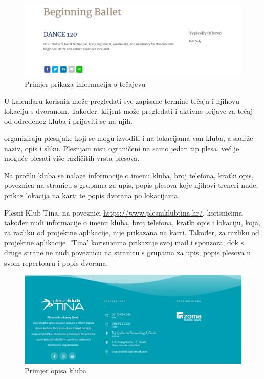 \begin{figure}[H]
	\centering
	\includegraphics[scale=0.3]{slike/opis_2.png}
	\caption{Primjer prikaza informacija o tečajevu}
	\label{fig:screenshot002}
\end{figure}

\noindent U kalendaru korisnik može pregledati sve zapisane termine tečaja i njihovu lokaciju s dvoranom. Također, klijent može pregledati i aktivne prijave za tečaj od određenog kluba i prijaviti se na njih.

\noindent {} organiziraju plesnjake koji se mogu izvoditi i na lokacijama van kluba, a sadrže naziv, opis i sliku. Plesnjaci nisu ograničeni na samo jedan tip plesa, već je moguće plesati više različitih vrsta plesova.

\noindent Na profilu kluba se nalaze informacije o imenu kluba, broj telefona, kratki opis, poveznica na stranicu s grupama za upis, popis plesova koje njihovi treneri nude, prikaz lokacija na karti te popis dvorana po lokacijama.

\noindent Plesni Klub Tina, na poveznici \url{https://www.plesniklubtina.hr/}, korisnicima također nudi informacije o imenu kluba, broj telefona, kratki opis i lokaciju, koja, za razliku od projektne aplikacije, nije prikazana na karti. Također, za razliku od projektne aplikacije, 'Tina' korisnicima prikazuje svoj mail i sponzora, dok s druge strane ne nudi poveznicu na stranicu s grupama za upis, popis plesova u svom repertoaru i popis dvorana.

\begin{figure}[H]
	\centering
	\includegraphics[scale=0.2]{slike/opis_3.png}
	\caption{Primjer opisa kluba}
	\label{fig:screenshot003}
\end{figure}

